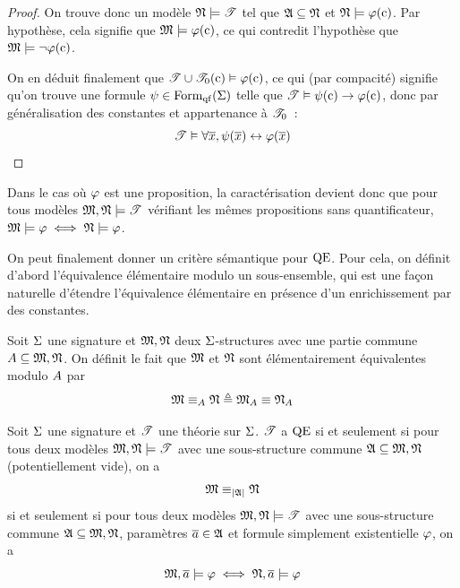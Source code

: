 \begin{proof}
  On trouve donc un modèle $\mathfrak{N}\models\mathscr T$ tel que $\mathfrak{A}\subseteq\mathfrak{N}$
  et $\mathfrak{N}\models\varphi(\mathrm{c})$. Par hypothèse, cela signifie que
  $\mathfrak{M}\models\varphi(\mathrm{c})$, ce qui contredit l'hypothèse que
  $\mathfrak{M}\models\lnot\varphi(\mathrm{c})$.

  On en déduit finalement que $\mathscr T\cup\mathscr T_0(\mathrm{c})\vDash\varphi(\mathrm{c})$, ce qui
  (par compacité) signifie qu'on trouve une formule
  $\psi\in\operatorname{Form}_{\mathrm{qf}}(\Sigma)$ telle que $\mathscr T\vDash\psi(\mathrm{c})\to\varphi(\mathrm{c})$,
  donc par généralisation des constantes et appartenance à $\mathscr T_0$~:
  \[\mathscr T\vDash\forall \overline{x}, \psi(\overline{x})\mathrel{\leftrightarrow}\varphi(\overline{x})\qedhere\]
\end{proof}

\begin{remark}
  Dans le cas où $\varphi$ est une proposition, la caractérisation devient donc
  que pour tous modèles $\mathfrak{M},\mathfrak{N}\models\mathscr T$ vérifiant les mêmes
  propositions sans quantificateur,
  $\mathfrak{M}\models\varphi\iff\mathfrak{N}\models\varphi$.
\end{remark}

On peut finalement donner un critère sémantique pour $\operatorname{QE}$. Pour cela, on
définit d'abord l'équivalence élémentaire modulo un sous-ensemble, qui est une
façon naturelle d'étendre l'équivalence élémentaire en présence d'un
enrichissement par des constantes.

\begin{definition}
  Soit $\Sigma$ une signature et $\mathfrak{M},\mathfrak{N}$ deux $\Sigma$-structures avec
  une partie commune $A\subseteq\mathfrak{M},\mathfrak{N}$. On définit le fait que
  $\mathfrak{M}$ et $\mathfrak{N}$ sont élémentairement équivalentes modulo $A$ par
  \[\mathfrak{M}\equiv_{A}\mathfrak{N} \triangleq \mathfrak{M}_{A}\equiv\mathfrak{N}_{A}\]
\end{definition}

\begin{theorem}
  Soit $\Sigma$ une signature et $\mathscr T$ une théorie sur $\Sigma$. $\mathscr T$ a
  $\operatorname{QE}$ si et seulement si pour tous deux modèles $\mathfrak{M},\mathfrak{N}\models\mathscr T$
  avec une sous-structure commune $\mathfrak{A}\subseteq\mathfrak{M},\mathfrak{N}$
  (potentiellement vide), on a \[\mathfrak{M}\equiv_{\left\vert \mathfrak{A}\right\vert}\mathfrak{N}\]
  si et seulement si pour tous deux modèles $\mathfrak{M},\mathfrak{N}\models\mathscr T$ avec une
  sous-structure commune $\mathfrak{A}\subseteq\mathfrak{M},\mathfrak{N}$, paramètres
  $\overline{a} \in \mathfrak{A}$ et formule simplement existentielle $\varphi$, on a
  \[\mathfrak{M},\overline{a} \models\varphi\iff\mathfrak{N},\overline{a} \models\varphi\]
\end{theorem}

